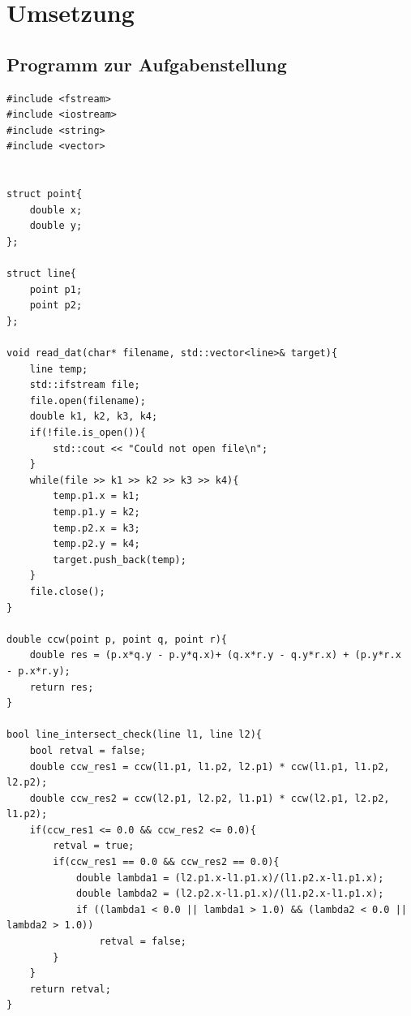\documentclass[12pt]{scrartcl}
\begin{document}
\section{Umsetzung}

\subsection{Programm zur Aufgabenstellung}

\begin{lstlisting}[style=CStyle, caption={p1\_lib.h: Bibliotheksfunktionen},captionpos=b]
#include <fstream>
#include <iostream>
#include <string>
#include <vector>


struct point{
    double x;
    double y;
};

struct line{
    point p1;
    point p2;
};

void read_dat(char* filename, std::vector<line>& target){
    line temp;
    std::ifstream file;
    file.open(filename);
    double k1, k2, k3, k4;
    if(!file.is_open()){
        std::cout << "Could not open file\n";
    }
    while(file >> k1 >> k2 >> k3 >> k4){
        temp.p1.x = k1;
        temp.p1.y = k2;
        temp.p2.x = k3;
        temp.p2.y = k4;
        target.push_back(temp);
    }
    file.close();
}

double ccw(point p, point q, point r){
    double res = (p.x*q.y - p.y*q.x)+ (q.x*r.y - q.y*r.x) + (p.y*r.x  - p.x*r.y);
    return res;
}

bool line_intersect_check(line l1, line l2){
    bool retval = false;
    double ccw_res1 = ccw(l1.p1, l1.p2, l2.p1) * ccw(l1.p1, l1.p2, l2.p2);
    double ccw_res2 = ccw(l2.p1, l2.p2, l1.p1) * ccw(l2.p1, l2.p2, l1.p2);
    if(ccw_res1 <= 0.0 && ccw_res2 <= 0.0){
        retval = true;
        if(ccw_res1 == 0.0 && ccw_res2 == 0.0){
            double lambda1 = (l2.p1.x-l1.p1.x)/(l1.p2.x-l1.p1.x);
            double lambda2 = (l2.p2.x-l1.p1.x)/(l1.p2.x-l1.p1.x);
            if ((lambda1 < 0.0 || lambda1 > 1.0) && (lambda2 < 0.0 || lambda2 > 1.0)) 
                retval = false;
        }
    }
    return retval;
}
\end{lstlisting}
\end{document}
